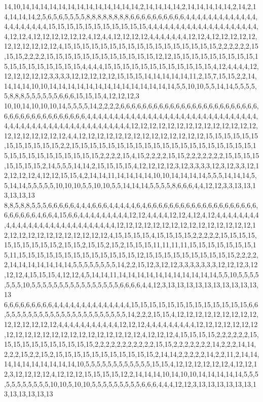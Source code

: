 14,10,14,14,14,14,14,14,14,14,14,14,14,14,14,2,14,14,14,14,2,14,14,14,14,14,2,14,2,14,14,14,14,2,5,6,5,6,5,5,5,5,8,8,8,8,8,8,8,8,6,6,6,6,6,6,6,6,6,6,4,4,4,4,4,4,4,4,4,4,4,4,4,4,4,4,4,4,4,4,4,15,15,15,15,15,15,15,15,15,15,15,4,4,4,4,4,4,4,4,4,4,4,4,4,4,4,4,4,4,4,4,4,12,12,4,12,12,12,12,12,12,4,12,4,4,12,12,12,12,4,4,4,4,4,4,4,12,12,4,12,12,12,12,12,12,12,12,12,12,12,4,15,15,15,15,15,15,15,15,15,15,15,15,15,15,15,15,15,2,2,2,2,2,2,15,15,15,2,2,2,2,15,15,15,15,15,15,15,15,15,15,15,15,12,12,15,15,15,15,15,15,15,15,15,15,15,15,15,15,15,15,15,15,4,4,4,4,15,15,15,15,15,15,15,15,15,15,15,15,4,12,4,4,4,4,12,12,12,12,12,12,3,3,3,3,12,12,12,12,12,15,15,15,14,14,14,14,14,11,2,15,7,15,15,2,2,14,14,14,14,10,10,14,14,14,14,14,14,14,14,14,14,14,14,14,14,5,5,10,10,5,5,14,14,5,5,5,5,5,8,8,8,5,5,5,5,5,5,6,6,6,15,15,15,4,12,12,12,3
10,10,14,10,10,10,14,5,5,5,5,14,2,2,2,2,6,6,6,6,6,6,6,6,6,6,6,6,6,6,6,6,6,6,6,6,6,6,6,6,6,6,6,6,6,6,6,6,6,6,6,6,6,6,6,6,4,4,4,4,4,4,4,4,4,4,4,4,4,4,4,4,4,4,4,4,4,4,4,4,4,4,4,4,4,4,4,4,4,4,4,4,4,4,4,4,4,4,4,4,4,4,4,4,4,4,4,4,4,4,12,12,12,12,12,12,12,12,12,12,12,12,12,12,12,12,12,12,12,12,12,4,4,12,12,12,12,12,12,12,12,12,12,12,12,12,12,15,15,15,15,15,15,15,15,15,15,15,15,2,2,15,15,15,15,15,15,15,15,15,15,15,15,15,15,15,15,15,15,15,15,15,15,15,15,15,15,15,15,15,15,15,2,2,2,2,15,4,15,2,2,2,2,15,15,2,2,2,2,2,2,2,15,15,15,15,15,15,15,15,2,14,5,5,5,14,14,2,15,15,15,15,4,12,12,12,12,3,12,3,3,3,3,12,3,12,3,3,12,12,12,12,12,4,12,12,15,15,4,2,14,14,11,14,14,14,14,10,10,14,14,14,14,5,5,5,14,14,14,5,5,14,14,5,5,5,5,5,10,10,10,5,5,10,10,5,5,14,14,14,5,5,5,5,8,6,6,6,4,4,12,12,3,3,13,13,13,13,13,13
8,8,5,8,8,5,5,5,6,6,6,6,6,4,4,4,6,6,6,4,4,4,4,4,6,4,6,6,6,6,6,6,6,6,6,6,6,6,6,6,6,6,6,6,6,6,6,6,6,6,6,6,4,6,6,4,15,6,6,4,4,4,4,4,4,4,4,4,12,12,4,4,4,4,12,12,4,12,4,12,4,4,4,4,4,4,4,4,4,4,4,4,4,4,4,4,4,4,4,4,4,4,4,4,4,4,4,4,12,12,12,12,12,12,12,12,12,12,12,12,12,12,12,12,12,12,12,12,12,12,12,12,12,12,12,4,15,15,15,15,4,15,15,15,15,2,2,2,2,2,15,15,15,15,15,15,15,15,15,15,2,15,15,2,15,15,2,15,2,15,15,15,11,11,11,11,15,15,15,15,15,15,15,15,11,15,15,15,15,15,15,15,15,15,15,15,15,15,12,15,15,15,15,15,15,15,15,15,15,2,2,2,2,2,14,14,14,14,14,14,14,5,5,5,5,5,5,5,5,14,2,2,15,12,3,12,12,3,3,3,3,3,3,3,12,12,12,3,12,12,12,4,15,15,15,4,12,12,4,5,14,14,11,14,14,14,14,14,14,14,14,14,14,14,5,5,10,5,5,5,5,5,5,5,10,5,5,5,5,5,5,5,5,5,5,5,5,5,5,5,5,6,6,6,6,4,4,12,3,13,13,13,13,13,13,13,13,13,13,13
6,6,6,6,6,6,6,6,6,4,4,4,4,4,4,4,4,4,4,4,4,4,4,15,15,15,15,15,15,15,15,15,15,15,15,15,6,6,5,5,5,5,5,5,5,5,5,5,5,5,5,5,5,5,5,5,5,5,5,5,14,2,2,2,15,15,4,12,12,12,12,12,12,12,12,12,12,12,12,12,12,12,4,4,4,4,4,4,4,4,4,4,4,12,12,12,4,4,4,4,4,4,4,4,4,12,12,12,12,12,12,12,12,12,12,12,12,12,12,12,12,12,12,12,12,12,12,4,12,12,12,4,15,15,15,15,2,2,2,2,2,2,15,15,15,15,15,15,15,15,15,15,15,2,2,2,2,2,2,2,2,2,2,2,15,15,2,2,2,2,2,2,2,14,2,2,2,14,14,2,2,2,15,2,2,15,2,15,15,15,15,15,15,15,15,15,15,15,2,14,14,2,2,2,2,2,14,2,2,11,2,14,14,14,14,14,14,14,14,14,14,10,5,5,5,5,5,5,5,5,5,5,5,5,15,15,4,12,12,12,12,12,12,4,12,12,12,3,12,12,12,12,4,12,12,12,15,15,15,15,12,2,14,14,14,10,14,10,10,14,14,14,14,14,5,5,5,5,5,5,5,5,5,5,5,10,10,5,10,10,5,5,5,5,5,5,5,5,5,6,6,6,4,4,4,12,12,3,13,13,13,13,13,13,13,13,13,13,13,13
